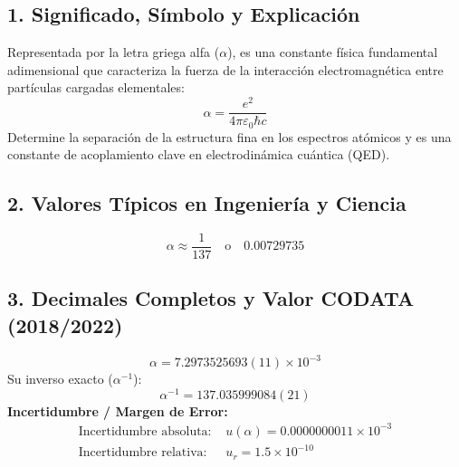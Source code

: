 \documentclass[12pt,a4paper]{article}
\begin{document}
\subsection*{1. Significado, Símbolo y Explicación}
Representada por la letra griega alfa ($\alpha$), es una constante física fundamental adimensional que caracteriza la fuerza de la interacción electromagnética entre partículas cargadas elementales:
\begin{equation*}
\alpha = \frac{e^2}{4\pi \varepsilon_0 \hbar c}
\end{equation*}
Determine la separación de la estructura fina en los espectros atómicos y es una constante de acoplamiento clave en electrodinámica cuántica (QED).

\subsection*{2. Valores Típicos en Ingeniería y Ciencia}
\begin{equation*}
\alpha \approx \frac{1}{137} \quad \text{o} \quad 0.00729735
\end{equation*}

\subsection*{3. Decimales Completos y Valor CODATA (2018/2022)}
\begin{equation*}
\alpha = 7.2973525693(11) \times 10^{-3}
\end{equation*}
Su inverso exacto ($\alpha^{-1}$):
\begin{equation*}
\alpha^{-1} = 137.035999084(21)
\end{equation*}
\textbf{Incertidumbre / Margen de Error:}
\begin{align*}
\text{Incertidumbre absoluta: } & u(\alpha) = 0.0000000011 \times 10^{-3} \\
\text{Incertidumbre relativa: } & u_r = 1.5 \times 10^{-10}
\end{align*}
\end{document}

